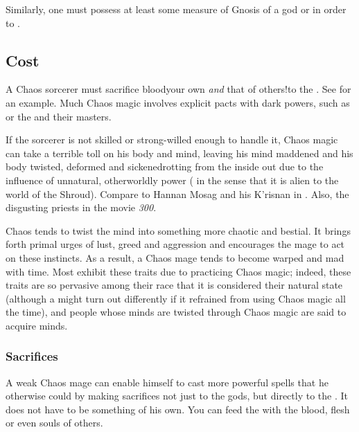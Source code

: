 Similarly, one must possess at least some measure of Gnosis of a god or  in order to . 






\subsection{Cost}
A Chaos sorcerer must sacrifice blood\dash your own \emph{and} that of others!\dash to the . See  for an example. Much Chaos magic involves explicit pacts with dark powers, such as  or the  and their masters.

If the sorcerer is not skilled or strong-willed enough to handle it, Chaos magic can take a terrible toll on his body and mind, leaving his mind maddened and his body twisted, deformed and sickened\dash rotting from the inside out due to the influence of unnatural, otherworldly power ( in the sense that it is alien to the world of the Shroud). Compare to Hannan Mosag and his K'risnan in \cite{StevenEriksonIanCameronEsslemont:MalazanBookoftheFallen}. Also, the disgusting priests in the movie \emph{300}.

Chaos tends to twist the mind into something more chaotic and bestial. It brings forth primal urges of lust, greed and aggression and encourages the mage to act on these instincts. As a result, a Chaos mage tends to become warped and mad with time. Most \dragons{} exhibit these traits due to practicing Chaos magic; indeed, these traits are so pervasive among their race that it is considered their natural state (although a \dragon{} might turn out differently if it refrained from using Chaos magic all the time), and people whose minds are twisted through Chaos magic are said to acquire \draconic{} minds. 





\subsubsection{Sacrifices}
A weak Chaos mage can enable himself to cast more powerful spells that he otherwise could by making sacrifices not just to the gods, but directly to the . 
It does not have to be something of his own. 
You can feed the \daemons{} with the blood, flesh or even souls of others. 

